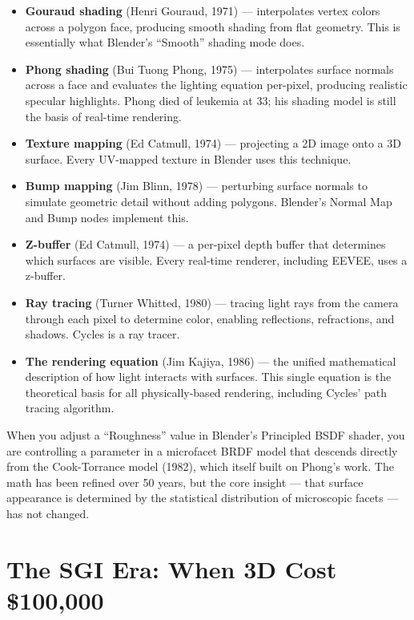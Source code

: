 \documentclass[11pt,letterpaper,twoside,openright]{book}
\begin{document}
\begin{itemize}[leftmargin=2em]
  \item \textbf{Gouraud shading} (Henri Gouraud, 1971) --- interpolates vertex colors across a polygon face, producing smooth shading from flat geometry. This is essentially what Blender's ``Smooth'' shading mode does.
  \item \textbf{Phong shading} (Bui Tuong Phong, 1975) --- interpolates surface normals across a face and evaluates the lighting equation per-pixel, producing realistic specular highlights. Phong died of leukemia at 33; his shading model is still the basis of real-time rendering.
  \item \textbf{Texture mapping} (Ed Catmull, 1974) --- projecting a 2D image onto a 3D surface. Every UV-mapped texture in Blender uses this technique.
  \item \textbf{Bump mapping} (Jim Blinn, 1978) --- perturbing surface normals to simulate geometric detail without adding polygons. Blender's Normal Map and Bump nodes implement this.
  \item \textbf{Z-buffer} (Ed Catmull, 1974) --- a per-pixel depth buffer that determines which surfaces are visible. Every real-time renderer, including EEVEE, uses a z-buffer.
  \item \textbf{Ray tracing} (Turner Whitted, 1980) --- tracing light rays from the camera through each pixel to determine color, enabling reflections, refractions, and shadows. Cycles is a ray tracer.
  \item \textbf{The rendering equation} (Jim Kajiya, 1986) --- the unified mathematical description of how light interacts with surfaces. This single equation is the theoretical basis for all physically-based rendering, including Cycles' path tracing algorithm.
\end{itemize}

\begin{tipbox}
When you adjust a ``Roughness'' value in Blender's Principled BSDF shader, you are controlling a parameter in a microfacet BRDF model that descends directly from the Cook-Torrance model (1982), which itself built on Phong's work. The math has been refined over 50 years, but the core insight --- that surface appearance is determined by the statistical distribution of microscopic facets --- has not changed.
\end{tipbox}

\section{The SGI Era: When 3D Cost \$100,000}
\end{document}
